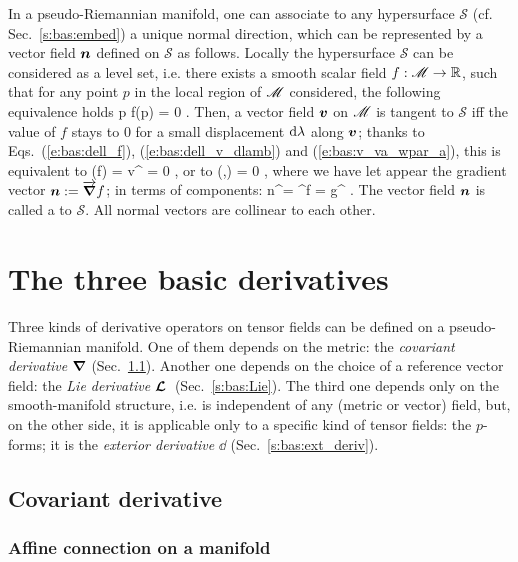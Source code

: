 In a pseudo-Riemannian manifold, one can associate to any hypersurface
$\mathscr{S}$ (cf. Sec.~\ref{s:bas:embed}) a unique normal direction, which can
be represented by a vector field $\bm{n}$ defined on $\mathscr{S}$ as follows.
Locally the hypersurface $\mathscr{S}$ can be considered as a level set, i.e.
there exists a smooth scalar field $f:\mathscr{M} \rightarrow \mathbb{R}$, such that for
any point $p$ in the local region of $\mathscr{M}$ considered, the following equivalence
holds
\be
    p\in {} \iff f(p) = 0 .
\ee
Then, a vector field $\bm{v}$ on $\mathscr{M}$ is tangent to $\mathscr{S}$ iff
the value of $f$ stays to $0$ for a small displacement
$\mathrm{d}\lambda$ along $\bm{v}$; thanks to Eqs.~(\ref{e:bas:dell_f}),
(\ref{e:bas:dell_v_dlamb}) and (\ref{e:bas:v_va_wpar_a}), this is equivalent to
\be
    (f) = v^\mu {} = 0 ,
\ee
or to
\be
    (,) = 0 ,
\ee
where we have let appear the gradient vector $\bm{n} := \overrightarrow{\bm{\nabla}} f$; in
terms of components:
\be
    n^\alpha = \nabla^\alpha f = g^{\alpha\mu}  .
\ee
The vector field $\bm{n}$ is called a 
 to $\mathscr{S}$. All normal vectors are collinear to each other.




\section{The three basic derivatives}

Three kinds of derivative operators on tensor fields can be defined on a
pseudo-Riemannian manifold. One of them depends on the metric:
the \emph{covariant derivative} $\bm{\nabla}$ (Sec.~\ref{s:bas:cov_deriv}).
Another one depends on the choice of a
reference vector field: the \emph{Lie derivative} $\bm{\mathcal{L}}_{\bm{}}\,$ (Sec.~\ref{s:bas:Lie}).
The third one depends only on the smooth-manifold structure, i.e.
is independent of any (metric or vector) field, but, on the other side,
it is applicable
only to a specific kind of tensor fields: the $p$-forms; it is the
\emph{exterior derivative} $\dd$ (Sec.~\ref{s:bas:ext_deriv}).


\subsection{Covariant derivative} \label{s:bas:cov_deriv}


\subsubsection{Affine connection on a manifold} \label{s:bas:affine_connect}

